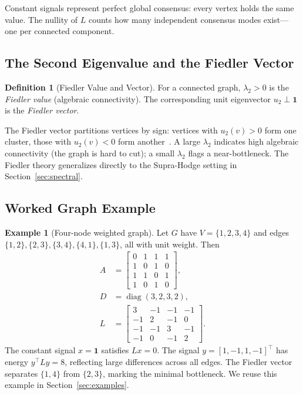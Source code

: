 \documentclass[11pt]{article}
\theoremstyle{definition}
\newtheorem{definition}[theorem]{Definition}
\newtheorem{example}[theorem]{Example}
\theoremstyle{remark}
\DeclareMathOperator{\diag}{diag}
\begin{document}
Constant signals represent perfect global consensus: every vertex holds the
same value. The nullity of $L$ counts how many independent consensus modes
exist---one per connected component.

\subsection{The Second Eigenvalue and the Fiedler Vector}

\begin{definition}[Fiedler Value and Vector]
For a connected graph, $\lambda_2 > 0$ is the \emph{Fiedler value} (algebraic
connectivity). The corresponding unit eigenvector $u_2 \perp \mathbf{1}$ is the
\emph{Fiedler vector}.
\end{definition}

The Fiedler vector partitions vertices by sign: vertices with $u_2(v)>0$ form
one cluster, those with $u_2(v)<0$ form another~\cite{chung1997}. A large
$\lambda_2$ indicates high algebraic connectivity (the graph is hard to cut);
a small $\lambda_2$ flags a near-bottleneck. The Fiedler theory generalizes
directly to the Supra-Hodge setting in Section~\ref{sec:spectral}.

\subsection{Worked Graph Example}

\begin{example}[Four-node weighted graph]
\label{ex:4node}
Let $G$ have $V=\{1,2,3,4\}$ and edges $\{1,2\},\{2,3\},\{3,4\},\{4,1\},\{1,3\}$,
all with unit weight. Then
\begingroup
\setlength{\arraycolsep}{3pt}
\small
\[
  \begin{aligned}
    A &= \begin{bmatrix}
      0 & 1 & 1 & 1\\
      1 & 0 & 1 & 0\\
      1 & 1 & 0 & 1\\
      1 & 0 & 1 & 0
    \end{bmatrix},\\[4pt]
    D &= \diag(3,2,3,2),\\[4pt]
    L &= \begin{bmatrix}
      3 & -1 & -1 & -1\\
      -1 & 2 & -1 & 0\\
      -1 & -1 & 3 & -1\\
      -1 & 0 & -1 & 2
    \end{bmatrix}.
  \end{aligned}
\]
\endgroup
The constant signal $x=\mathbf{1}$ satisfies $Lx=0$. The signal
$y=[1,-1,1,-1]^\top$ has energy $y^\top Ly = 8$, reflecting large differences
across all edges. The Fiedler vector separates $\{1,4\}$ from $\{2,3\}$,
marking the minimal bottleneck. We reuse this example in
Section~\ref{sec:examples}.
\end{example}
\end{document}
